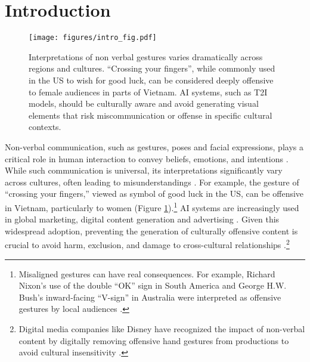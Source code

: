 \section{Introduction}
\begin{figure}[!t]
    \centering
    \texttt{[image: figures/intro\_fig.pdf]}
    \caption{Interpretations of non verbal gestures varies dramatically across regions and cultures. ``Crossing your fingers'', while commonly used in the US to wish for good luck, can be considered deeply offensive to female audiences in parts of Vietnam. AI systems, such as T2I models, should be culturally aware and avoid generating visual elements that risk miscommunication or offense in specific cultural contexts.}  
    \label{fig:intro-fig}
    \vspace{-1.2em}
\end{figure}



Non-verbal communication, such as gestures, poses and facial expressions, plays a critical role in human interaction to convey beliefs, emotions, and intentions \cite{knapp1978nonverbal, burgoon2011nonverbal}. While such communication is universal, its interpretations significantly vary across cultures, often leading to misunderstandings  \cite{kirch1979non, matsumoto2016cultural}. For example, the gesture of ``crossing your fingers,'' viewed as symbol of good luck in the US, can be offensive in Vietnam, particularly to women (Figure \ref{fig:intro-fig}).\footnote{Misaligned gestures can have real consequences. For example, Richard Nixon’s use of the double ``OK'' sign in South America and George H.W. Bush’s inward-facing ``V-sign'' in Australia were interpreted as offensive gestures by local audiences \cite{nyt_nixon_1974, nyt_gestures_1996, chicago_gestures_1992}.} AI systems are increasingly used in global marketing, digital content generation and advertising \cite{Mim2024InBetweenVA}. Given this widespread adoption, preventing the generation of culturally offensive content is crucial to avoid harm, exclusion, and damage to cross-cultural relationships \cite{wenzel2024designing, ryan2024unintended}.\footnote{Digital media companies like Disney have recognized the impact of non-verbal content by digitally removing offensive hand gestures from productions to avoid cultural insensitivity \cite{chicago_tribune}.}


